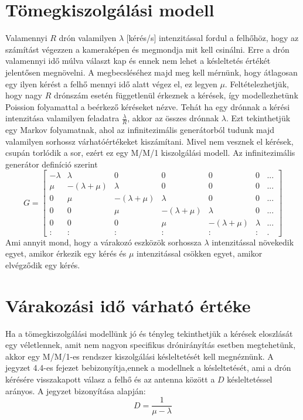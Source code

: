 \section{Tömegkiszolgálási modell}
Valamennyi $R$ drón valamilyen $\lambda$ [kérés/s] intenzitással fordul a felhőhöz, hogy az számítást végezzen a kameraképen és megmondja mit kell csinálni. Erre a drón valamennyi idő múlva választ kap és ennek nem lehet a késleltetés értékét jelentősen megnövelni. A megbecsléséhez majd meg kell mérnünk, hogy átlagosan egy ilyen kérést a felhő mennyi idő alatt végez el, ez legyen $\mu$.
Feltételezhetjük, hogy nagy $R$ drónszám esetén függetlenül érkeznek a kérések, így modellezhetünk Poission folyamattal a beérkező kéréseket nézve. Tehát ha egy drónnak a kérési intenzitása valamilyen feladatra $\frac{\lambda}{R}$, akkor az összes drónnak $\lambda$.
Ezt tekinthetjük egy Markov folyamatnak, ahol az infinitezimális generátorból tudunk majd valamilyen sorhossz várhatóértékeket kiszámítani. Mivel nem vesznek el kérések, csupán torlódik a sor, ezért ez egy M/M/1 kiszolgálási modell. \cite{toki}
Az infinitezimális generátor definíció szerint
\begin{equation} G =
\begin{bmatrix}
-\lambda & \lambda & 0 & 0 & 0 & 0 & ... \\
\mu & -(\lambda+\mu) & \lambda & 0 & 0 & 0 & ... \\
0 & \mu & -(\lambda+\mu) & \lambda & 0 & 0 & ... \\
0 & 0 & \mu & -(\lambda+\mu) & \lambda & 0 & ... \\
0 & 0 & 0 & \mu & -(\lambda+\mu) & \lambda & ... \\
: & : & : & : & : & : & .
\end{bmatrix}
\end{equation}
Ami annyit mond, hogy a várakozó eszközök sorhossza $\lambda$ intenzitással növekedik egyet, amikor érkezik egy kérés és $\mu$ intenzitással csökken egyet, amikor elvégződik egy kérés.

\section{Várakozási idő várható értéke}
Ha a tömegkiszolgálási modellünk jó és tényleg tekinthetjük a kérések eloszlását egy véletlennek, amit nem nagyon specifikus drónirányítás esetben megtehetünk, akkor egy M/M/1-es rendszer kiszolgálási késleltetését kell megnéznünk. A \cite{toki} jegyzet 4.4-es fejezet bebizonyítja,ennek a modellnek a késleltetését, ami a drón kérésére visszakapott válasz a felhő és az antenna között a $D$ késleltetéssel arányos. A jegyzet bizonyítása alapján: \begin{equation} D = \frac{1}{\mu - \lambda} \end{equation}
